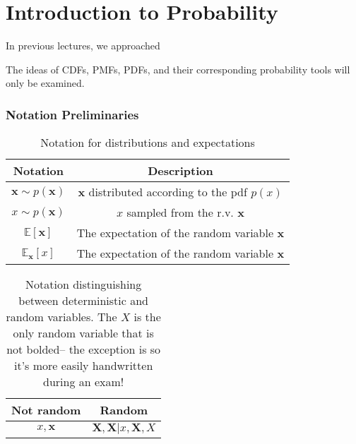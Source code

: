 \chapter{Introduction to Probability}

In previous lectures, we approached


The ideas of CDFs, PMFs, PDFs, and their corresponding probability tools will only be examined.


\subsection{Notation Preliminaries}

\begin{table}[h!]
    \centering
    \begin{tabular}{cc}
        \toprule
        \textbf{Notation}        & \textbf{Description}                               \\
        \midrule
        $\bm{x} \sim p(\bm{x})$  & \textbf{x} distributed according to the pdf $p(x)$ \\
        $x \sim p(\bm{x})$       & $x$ sampled from the r.v. \textbf{x}               \\
        $\mathbb{E}[\bm{x}]$     & The expectation of the random variable \textbf{x}  \\
        $\mathbb{E}_{\bm{x}}[x]$ & The expectation of the random variable \textbf{x}  \\
        \bottomrule
    \end{tabular}
    \caption{Notation for distributions and expectations}
\end{table}

\begin{table}[h!]
    \centering
    \begin{tabular}{cc}
        \toprule
        \textbf{Not random} & \textbf{Random}                             \\
        \midrule
        $x, \bm{x}$         & $\mathbf{X}, \mathbf{X} | x, \mathbf{X}, X$ \\
        \bottomrule
    \end{tabular}
    \caption{Notation distinguishing between deterministic and random variables. The $X$ is the only random variable that is not bolded– the exception is so it's more easily handwritten during an exam!}
\end{table}


